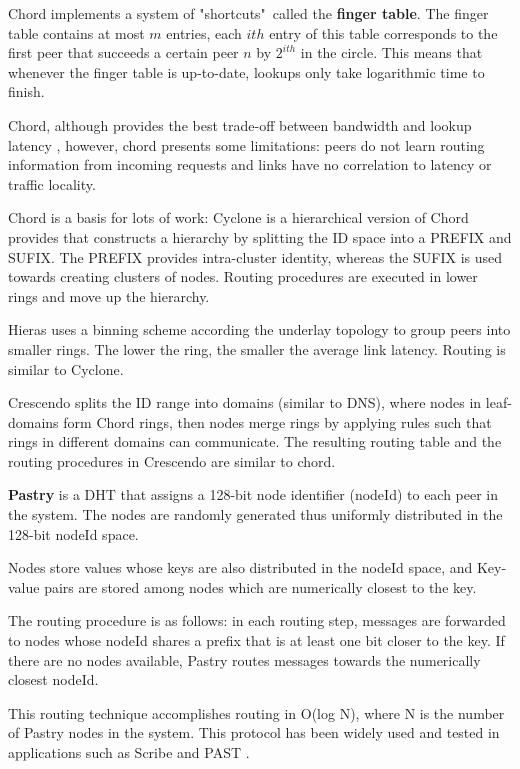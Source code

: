 Chord implements a system of "shortcuts"\ called the \textbf{finger table}. The finger table contains at most \(m\) entries, each $ith$ entry of this table corresponds to the first peer that succeeds a certain peer \(n\) by \(2^{ith}\) in the circle. This means that whenever the finger table is up-to-date, lookups only take logarithmic time to finish. 

Chord, although provides the best trade-off between bandwidth and lookup latency \cite{dht_performance_churn}, however, chord presents some limitations: peers do not learn routing information from incoming requests and links have no correlation to latency or traffic locality.

Chord is a basis for lots of work: Cyclone \cite{Artigas2005} is a hierarchical version of Chord provides that constructs a hierarchy by splitting the ID space into a PREFIX and SUFIX. The PREFIX provides intra-cluster identity, whereas the SUFIX is used towards creating clusters of nodes. Routing procedures are executed in lower rings and move up the hierarchy.  

Hieras \cite{1240580} uses a binning scheme according the underlay topology to group peers into smaller rings. The lower the ring, the smaller the average link latency. Routing is similar to Cyclone.

Crescendo \cite{Ganesan2004} splits the ID range into domains (similar to DNS), where nodes in leaf-domains form Chord rings, then nodes merge rings by applying rules such that rings in different domains can communicate. The resulting routing table and the routing procedures in Crescendo are similar to chord.

\textbf{Pastry} \cite{rowstron2001pastry} is a DHT that assigns a 128-bit node identifier (nodeId) to each peer in the system. The nodes are randomly generated thus uniformly distributed in the 128-bit nodeId space. 

Nodes store values whose keys are also distributed in the nodeId space, and Key-value pairs are stored among nodes which are numerically closest to the key. 

The routing procedure is as follows: in each routing step, messages are forwarded to nodes whose nodeId shares a prefix that is at least one bit closer to the key. If there are no nodes available, Pastry routes messages towards the numerically closest nodeId. 

This routing technique accomplishes routing in O(log N), where N is the number of Pastry nodes in the system. This protocol has been widely used and tested in applications such as Scribe \cite{10.1007/3-540-45546-9_3} and PAST \cite{990064}. 

